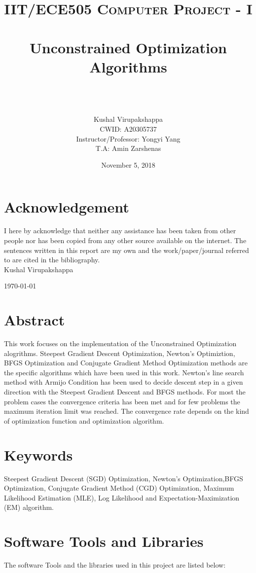 \documentclass[paper=a4, fontsize=11pt]{scrartcl}
\title{
		\usefont{OT1}{bch}{b}{n}
		\normalfont \normalsize \textsc{IIT/ECE505 Computer Project - I} \\ [25pt]
		\horrule{0.5pt} \\[0.4cm]
		\huge Unconstrained Optimization Algorithms \\
		\horrule{2pt} \\[0.5cm]
}
\author{
        \\[150pt]
        \normalfont 								\normalsize
        Kushal Virupakshappa\\[-3pt]		        \normalsize
        CWID: A20305737\\[-3pt]		                \normalsize
        Instructor/Professor: Yongyi Yang\\[-3pt]		    \normalsize
        T.A: Amin Zarshenas\\[-3pt]		            \normalsize        
}
\date{November 5, 2018}
\numberwithin{equation}{section}		%
\numberwithin{figure}{section}			%
\numberwithin{table}{section}				%
\begin{document}
\maketitle
\section*{Acknowledgement}

I here by acknowledge that neither any assistance has been taken from other people nor has been copied from any other source available on the internet. The sentences written in this report are my own and the work/paper/journal referred to are cited in the bibliography.\\[5pt]





Kushal Virupakshappa

\today
\date{}



\clearpage
\vspace*{2.5cm}

\section*{Abstract}
This work focuses on the implementation of the Unconstrained Optimization alogrithms. Steepest Gradient Descent Optimization, Newton's Optimiztion, BFGS Optimization and Conjugate Gradient Method Optimization methods are the specific algorithms which have been used in this work. Newton's line search method with Armijo Condition has been used to decide descent step in a given direction with the Steepest Gradient Descent and BFGS methods. For most the problem cases the convergence criteria has been met and for few problems the maximum iteration limit was reached. The convergence rate depends on the kind of optimization function and optimization algorithm. \\
\section{Keywords}
Steepest Gradient Descent (SGD) Optimization, Newton's Optimization,BFGS Optimization, Conjugate Gradient Method (CGD) Optimization, Maximum Likelihood Estimation (MLE), Log Likelihood and Expectation-Maximization (EM) algorithm.
\section{Software Tools and Libraries}
The software Tools and the libraries used in this project are listed below:
\end{document}
